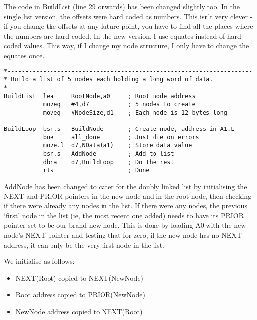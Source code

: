 The code in BuildList (line 29 onwards) has been changed slightly too. In the single list version, the offsets were hard coded as numbers. This isn't very clever -{} if you change the offsets at any future point, you have to find all the places where the numbers are hard coded. In the new version, I use equates instead of hard coded values. This way, if I change my node structure, I only have to change the equates once.

\begin{lstlisting}[firstnumber=29,caption={Doubly Linked List - Demo Code - Build List}]
*---------------------------------------------------------------------
* Build a list of 5 nodes each holding a long word of data.
*---------------------------------------------------------------------
BuildList  lea     RootNode,a0     ; Root node address
           moveq   #4,d7           ; 5 nodes to create
           moveq   #NodeSize,d1    ; Each node is 12 bytes long

BuildLoop  bsr.s   BuildNode       ; Create node, address in A1.L
           bne     all_done        ; Just die on errors
           move.l  d7,NData(a1)    ; Store data value
           bsr.s   AddNode         ; Add to list
           dbra    d7,BuildLoop    ; Do the rest
           rts                     ; Done
\end{lstlisting}

AddNode has been changed to cater for the doubly linked list by initialising the NEXT
and PRIOR pointers in the new node and in the root node, then checking if there were
already any nodes in the list. If there were any nodes, the previous `first' node in
the list (ie, the most recent one added) needs to have its PRIOR pointer set to be our
brand new node. This is done by loading A0 with the new node's NEXT pointer and testing
that for zero, if the new node has no NEXT address, it can only be the very first node
in the list.

We initialise as follows:
\begin{itemize}[itemsep=0pt]

\item{}NEXT(Root) copied to NEXT(NewNode)


\item{}Root address copied to PRIOR(NewNode)


\item{}NewNode address copied to NEXT(Root)

\end{itemize}

